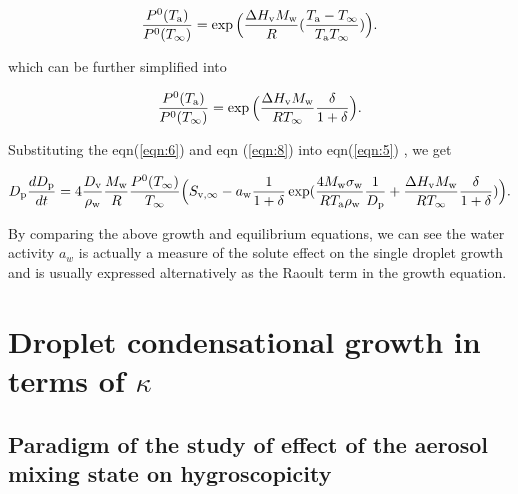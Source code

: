 \documentclass[12pt]{article}
\begin{document}
\begin{equation}\label{eqn:7}
\frac{P^{\rm 0}(T_{\rm a})}{P^{\rm 0}(T_{\infty})}=\exp \Big(\frac{\Delta H_{\rm v} M_{\rm w}}{R} (\frac{T_{\rm a}-T_{\infty}}{T_{\rm a} T_{\infty}})\Big).
\end{equation}

which can be further simplified into 

\begin{equation}\label{eqn:8}
\frac{P^{\rm 0}(T_{\rm a})}{P^{\rm 0}(T_{\infty})}=\exp \Big(\frac{\Delta H_{\rm v} M_{\rm w}}{R T_{\infty}} \frac{\delta}{1+\delta}\Big).
\end{equation}

Substituting the eqn(\ref{eqn:6}) and eqn (\ref{eqn:8}) into eqn(\ref{eqn:5}) , we get

\begin{equation}\label{eqn:9}
D_{\rm p}\frac{dD_{\rm p}}{dt}=4 \frac{D_{\rm v}} {\rho_{\rm w}} \frac{M_{\rm w}}{R} \frac{P^{\rm 0}(T_{\infty})} {T_{\infty}} \Big(S_{\rm v, \infty} - a_{\rm w} \frac{1}{1+\delta} \exp(\frac{4 M_{\rm w}\sigma_{\rm w}}{R T_{\rm a} \rho_{\rm w}}\frac{1}{D_{\rm p}}+\frac{\Delta H_{\rm v} M_{\rm w}}{R T_{\infty}} \frac{\delta}{1+\delta})\Big).
\end{equation}

By comparing the above growth and equilibrium equations, we can see the water activity $a_{w}$ is actually a measure of the solute effect on the single droplet growth and is usually expressed alternatively as the Raoult term in the growth equation.




\section{Droplet condensational growth in terms of $\kappa$}

\subsection{Paradigm of the study of effect of the aerosol mixing state on hygroscopicity}
\end{document}
